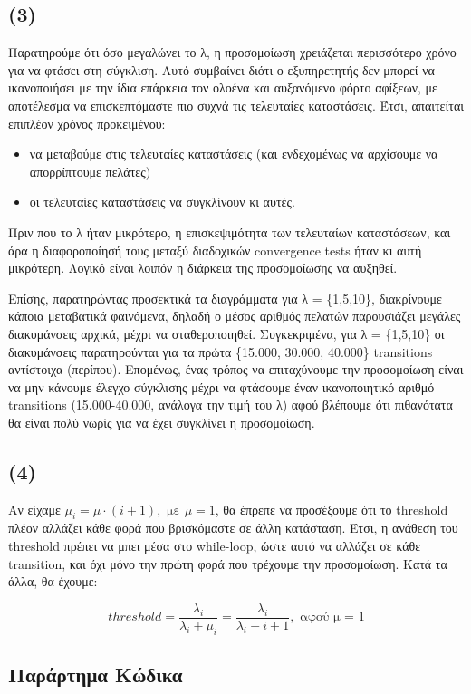 \documentclass[a4paper]{article}
\begin{document}
\subsection*{(3)}

Παρατηρούμε ότι όσο μεγαλώνει το λ, η προσομοίωση χρειάζεται περισσότερο χρόνο για να φτάσει στη σύγκλιση. Αυτό συμβαίνει διότι ο εξυπηρετητής δεν μπορεί να ικανοποιήσει με την ίδια επάρκεια τον ολοένα και αυξανόμενο φόρτο αφίξεων, με αποτέλεσμα να επισκεπτόμαστε πιο συχνά τις τελευταίες καταστάσεις. Έτσι, απαιτείται επιπλέον χρόνος προκειμένου:
 
\begin{itemize}
	\item να μεταβούμε στις τελευταίες καταστάσεις (και ενδεχομένως να αρχίσουμε να απορρίπτουμε πελάτες)
	\item οι τελευταίες καταστάσεις να συγκλίνουν κι αυτές. 
\end{itemize}

Πριν που το λ ήταν μικρότερο, η επισκεψιμότητα των τελευταίων καταστάσεων, και άρα η διαφοροποίησή τους μεταξύ διαδοχικών convergence tests ήταν κι αυτή μικρότερη. Λογικό είναι λοιπόν η διάρκεια της προσομοίωσης να αυξηθεί.

Επίσης, παρατηρώντας προσεκτικά τα διαγράμματα για λ = \{1,5,10\}, διακρίνουμε κάποια μεταβατικά φαινόμενα, δηλαδή ο μέσος αριθμός πελατών παρουσιάζει μεγάλες διακυμάνσεις αρχικά, μέχρι να σταθεροποιηθεί. Συγκεκριμένα, για λ = \{1,5,10\} οι διακυμάνσεις παρατηρούνται για τα πρώτα \{15.000, 30.000, 40.000\} transitions αντίστοιχα (περίπου). Επομένως, ένας τρόπος να επιταχύνουμε την προσομοίωση είναι να μην κάνουμε έλεγχο σύγκλισης μέχρι να φτάσουμε έναν ικανοποιητικό αριθμό transitions (15.000-40.000, ανάλογα την τιμή του λ) αφού βλέπουμε ότι πιθανότατα θα είναι πολύ νωρίς για να έχει συγκλίνει η προσομοίωση. 

\subsection*{(4)}

Αν είχαμε $ μ_i = μ \cdot (i+1), \text{ με } μ = 1 $, θα έπρεπε να προσέξουμε ότι το threshold πλέον αλλάζει κάθε φορά που βρισκόμαστε σε άλλη κατάσταση. Έτσι, η ανάθεση του threshold πρέπει να μπει μέσα στο while-loop, ώστε αυτό να αλλάζει σε κάθε transition, και όχι μόνο την πρώτη φορά που τρέχουμε την προσομοίωση. Κατά τα άλλα, θα έχουμε:

\[
	threshold = \frac{λ_i}{λ_i+μ_i} = \frac{λ_i}{λ_i+i+1}, \text{ αφού μ = 1}
\]

\subsection*{Παράρτημα Κώδικα}

\end{document}
